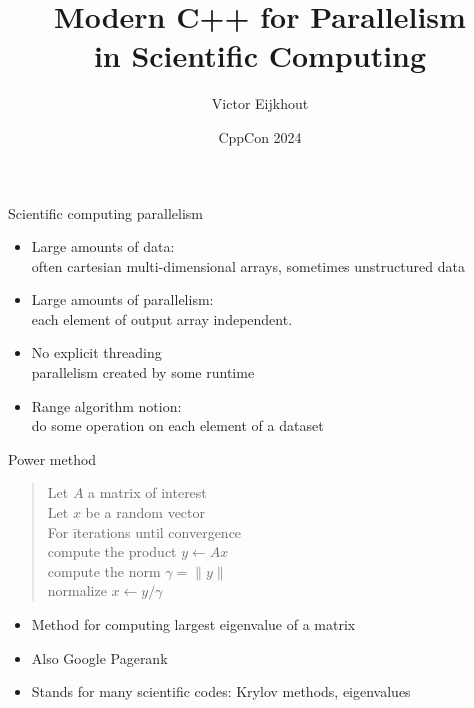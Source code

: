 \documentclass[10pt]{beamer}
\begin{document}


\author[Eijkhout]{Victor Eijkhout}
\date[CppCon2024]{CppCon 2024}
\title[C++ Parallel]{Modern C++ for Parallelism\\ in Scientific Computing}
\maketitle

\begin{frame}{Scientific computing parallelism}
  \begin{itemize}
  \item Large amounts of data: \\
    often cartesian multi-dimensional arrays, sometimes unstructured data
  \item Large amounts of parallelism:\\
    each element of output array independent.
  \item No explicit threading\\
    parallelism created by some runtime
  \item Range algorithm notion:\\
    do some operation on each element of a dataset
  \end{itemize}
\end{frame}

\begin{frame}[containsverbatim]{Power method}
  \begin{quote}
    \begin{tabbing}
      Let $A$ a matrix of interest\\
      Let $x$ be a random vector\\
      For \=iterations until convergence\\
      \> compute the product $y\leftarrow Ax$\\
      \> compute the norm $\gamma=\| y \|$\\
      \> normalize $x\leftarrow y/\gamma$\\
    \end{tabbing}
  \end{quote}
  \begin{itemize}
  \item Method for computing largest eigenvalue of a matrix
  \item Also Google Pagerank
  \item Stands for many scientific codes: Krylov methods, eigenvalues
  \end{itemize}
\end{frame}
\end{document}
